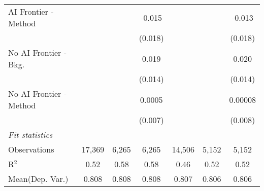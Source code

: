 \begin{tabular}{lcccccc}
   AI Frontier - Method    &                &               & -0.015        &                &               & -0.013\\   
                           &                &               & (0.018)       &                &               & (0.018)\\   
   No AI Frontier - Bkg.   &                &               & 0.019         &                &               & 0.020\\   
                           &                &               & (0.014)       &                &               & (0.014)\\   
   No AI Frontier - Method &                &               & 0.0005        &                &               & 0.00008\\   
                           &                &               & (0.007)       &                &               & (0.008)\\   
   \midrule
   \emph{Fit statistics}\\
   Observations            & 17,369         & 6,265         & 6,265         & 14,506         & 5,152         & 5,152\\  
   R$^2$                   & 0.52           & 0.58          & 0.58          & 0.46           & 0.52          & 0.52\\  
Mean(Dep. Var.) & 0.808 & 0.808 & 0.808 & 0.807 & 0.806 & 0.806 \\
   

\end{tabular}
